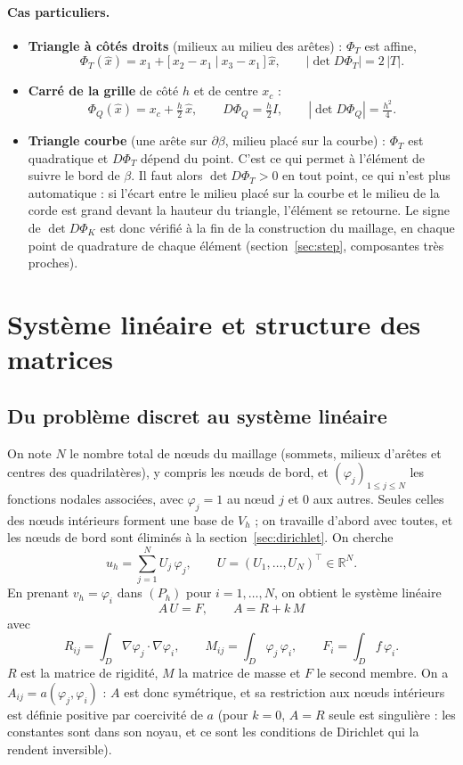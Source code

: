 \documentclass[11pt,a4paper]{article}
\begin{document}
\paragraph{Cas particuliers.}
\begin{itemize}
  \item \textbf{Triangle à côtés droits} (milieux au milieu des arêtes) : $\Phi_T$ est
        affine,
        \[
        \Phi_T(\hat{x}) = x_1 + \big[\, x_2 - x_1 \ \big|\ x_3 - x_1 \,\big]\, \hat{x},
        \qquad \left|\det D\Phi_T\right| = 2\,|T| .
        \]
  \item \textbf{Carré de la grille} de côté $h$ et de centre $x_c$ :
        \[
        \Phi_Q(\hat{x}) = x_c + \tfrac{h}{2}\, \hat{x},
        \qquad D\Phi_Q = \tfrac{h}{2} I,
        \qquad \left|\det D\Phi_Q\right| = \tfrac{h^2}{4} .
        \]
  \item \textbf{Triangle courbe} (une arête sur $\partial\beta$, milieu placé
        sur la courbe) : $\Phi_T$ est quadratique et $D\Phi_T$ dépend du point.
        C'est ce qui permet à l'élément de suivre le bord de $\beta$. Il faut
        alors $\det D\Phi_T > 0$ en tout point, ce qui n'est plus automatique :
        si l'écart entre le milieu placé sur la courbe et le milieu de la
        corde est grand devant la hauteur du triangle, l'élément se
        retourne. Le signe de $\det D\Phi_K$ est donc vérifié à la fin de la
        construction du maillage, en chaque point de quadrature de chaque
        élément (section~\ref{sec:step}, composantes très proches).
\end{itemize}

\section{Système linéaire et structure des matrices}

\subsection{Du problème discret au système linéaire}

On note $N$ le nombre total de nœuds du maillage (sommets, milieux
d'arêtes et centres des quadrilatères), y compris les nœuds de bord, et
$(\varphi_j)_{1 \le j \le N}$ les fonctions nodales associées, avec
$\varphi_j = 1$ au nœud $j$ et $0$ aux autres. Seules celles des nœuds
intérieurs forment une base de $V_h$ ; on travaille d'abord avec toutes,
et les nœuds de bord sont éliminés à la section~\ref{sec:dirichlet}.
On cherche
\[
u_h = \sum_{j=1}^{N} U_j\, \varphi_j ,
\qquad U = (U_1,\dots,U_N)^\top \in \mathbb{R}^N .
\]
En prenant $v_h = \varphi_i$ dans $(P_h)$ pour $i = 1,\dots,N$, on obtient
le système linéaire
\[
\boxed{\ A\,U = F, \qquad A = R + k\, M\ }
\]
avec
\[
R_{ij} = \int_D \nabla\varphi_j \cdot \nabla\varphi_i ,
\qquad
M_{ij} = \int_D \varphi_j\, \varphi_i ,
\qquad
F_i = \int_D f\, \varphi_i .
\]
$R$ est la matrice de rigidité, $M$ la matrice de masse et $F$ le second
membre. On a $A_{ij} = a(\varphi_j, \varphi_i)$ : $A$ est donc symétrique,
et sa restriction aux nœuds intérieurs est définie positive par coercivité
de $a$ (pour $k = 0$, $A = R$ seule est singulière : les constantes sont
dans son noyau, et ce sont les conditions de Dirichlet qui la rendent
inversible).
\end{document}
